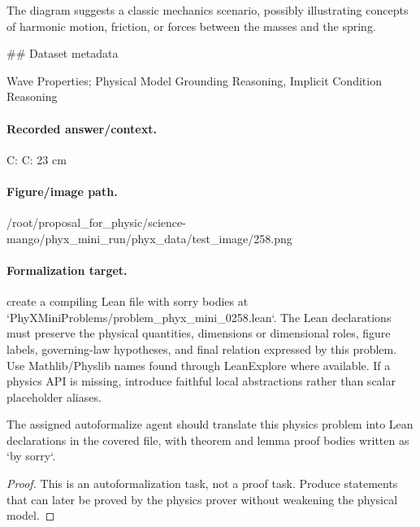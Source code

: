 The diagram suggests a classic mechanics scenario, possibly illustrating concepts of harmonic motion, friction, or forces between the masses and the spring.

\#\# Dataset metadata

Wave Properties; Physical Model Grounding Reasoning, Implicit Condition Reasoning

\paragraph{Recorded answer/context.}
C: C: 23 cm

\paragraph{Figure/image path.}
/root/proposal\_for\_physic/science-mango/phyx\_mini\_run/phyx\_data/test\_image/258.png

\paragraph{Formalization target.}
create a compiling Lean file with sorry bodies at `PhyXMiniProblems/problem\_phyx\_mini\_0258.lean`. The Lean declarations must preserve the physical quantities, dimensions or dimensional roles, figure labels, governing-law hypotheses, and final relation expressed by this problem.
Use Mathlib/Physlib names found through LeanExplore where available. If a physics API is missing, introduce faithful local abstractions rather than scalar placeholder aliases.

\begin{theorem}
\label{thm:physics:phyx_mini_0258:target}
The assigned autoformalize agent should translate this physics problem into Lean declarations in the covered file, with theorem and lemma proof bodies written as `by sorry`.
\end{theorem}
\begin{proof}
This is an autoformalization task, not a proof task. Produce statements that can later be proved by the physics prover without weakening the physical model.
\end{proof}

